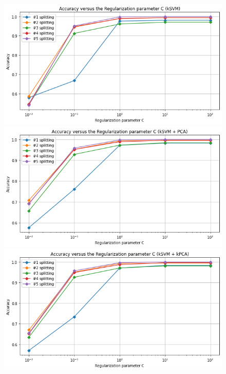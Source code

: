 \documentclass{article}
\begin{document}
\begin{figure}[!htb]
  \includegraphics[width=\linewidth]{figure/ksvm.png}
\endminipage\hfill
{}
  \includegraphics[width=\linewidth]{figure/ksvm_pca.png}
\endminipage\hfill
{}
  \includegraphics[width=\linewidth]{figure/ksvm_kpca.png}
\endminipage\hfill

\end{figure}
\end{document}
